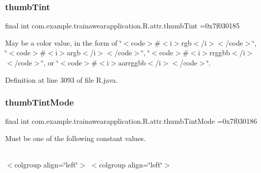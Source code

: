 \mbox{\label{classcom_1_1example_1_1trainawearapplication_1_1_r_1_1attr_afc9b5cac7660ecd32144237abe4bc5a7}} 
\subsubsection{\texorpdfstring{thumbTint}{thumbTint}}
{\footnotesize\ttfamily final int com.\+example.\+trainawearapplication.\+R.\+attr.\+thumb\+Tint =0x7f030185\hspace{0.3cm}{\ttfamily [static]}}

May be a color value, in the form of \char`\"{}$<$code$>$\#$<$i$>$rgb$<$/i$>$$<$/code$>$\char`\"{}, \char`\"{}$<$code$>$\#$<$i$>$argb$<$/i$>$$<$/code$>$\char`\"{}, \char`\"{}$<$code$>$\#$<$i$>$rrggbb$<$/i$>$$<$/code$>$\char`\"{}, or \char`\"{}$<$code$>$\#$<$i$>$aarrggbb$<$/i$>$$<$/code$>$\char`\"{}. 

Definition at line 3093 of file R.\+java.

\mbox{\label{classcom_1_1example_1_1trainawearapplication_1_1_r_1_1attr_ad235baed018e1101b3c089a8332da90c}} 
\subsubsection{\texorpdfstring{thumbTintMode}{thumbTintMode}}
{\footnotesize\ttfamily final int com.\+example.\+trainawearapplication.\+R.\+attr.\+thumb\+Tint\+Mode =0x7f030186\hspace{0.3cm}{\ttfamily [static]}}

Must be one of the following constant values.

\tabulinesep=1mm
\begin{longtabu}spread 0pt [c]{*{0}{|X[-1]}|}
\hline
\end{longtabu}
$<$colgroup align=\char`\"{}left\char`\"{}$>$ $<$colgroup align=\char`\"{}left\char`\"{}$>$ 

